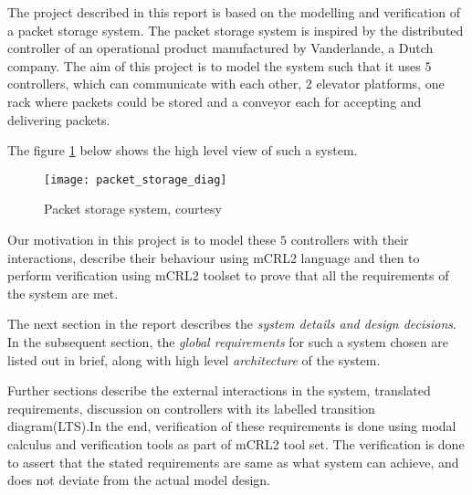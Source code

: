 
The project described in this report is based on the modelling and verification of a packet storage system. The packet storage system is inspired by the distributed controller of an operational product manufactured by Vanderlande, a Dutch company. 
The aim of this project is to model the system such that it uses $5$ controllers, which can communicate with each other, $2$ elevator platforms, one rack where packets could be stored and a conveyor each for accepting and delivering packets.

The figure \ref{fig:packet_storage} below shows the high level view of such a system.
\begin{figure}[h]
\center
\texttt{[image: packet\_storage\_diag]}
\caption{Packet storage system, courtesy \cite{problem_statement}}
\label{fig:packet_storage}
\end{figure}

Our motivation in this project is to model these $5$ controllers with their interactions, describe their behaviour using mCRL2 language and then to perform verification using mCRL2 toolset to prove that all the requirements of the system are met.

The next section in the report describes the \textit{system details and design decisions}. In the subsequent section, the \textit{global requirements} for such a system chosen are listed out in brief, along with high level \textit{architecture} of the system. 

Further sections describe the external interactions in the system, translated requirements, discussion on controllers with its labelled transition diagram(LTS).In the end, verification of these requirements is done using modal calculus and verification tools as part of mCRL2 tool set. The verification is done to assert that the stated requirements are same as what system can achieve, and does not deviate from the actual model design.